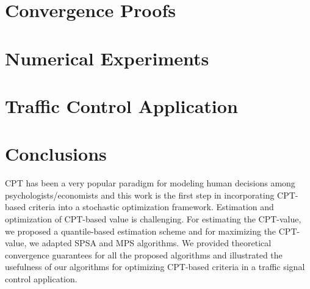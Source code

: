 \documentclass[twocolumn]{IEEEtran}
\begin{document}
\section{Convergence Proofs}
\label{sec:convergence}

\section{Numerical Experiments}
\label{sec:expts}


\section{Traffic Control Application}
\label{sec:expts}





\section{Conclusions}
\label{sec:conclusions}
CPT has been a very popular paradigm for modeling human decisions among psychologists/economists and this work is the first step in incorporating CPT-based criteria into a stochastic optimization framework. Estimation and optimization of CPT-based value is challenging. 
For estimating the CPT-value, we proposed a quantile-based estimation scheme and for maximizing the CPT-value, we adapted SPSA \cite{spall} and MPS \cite{chang2013simulation} algorithms. 
We provided theoretical convergence guarantees for all the proposed algorithms and illustrated the usefulness of our algorithms for optimizing CPT-based criteria in a traffic signal control application.



%





%
\end{document}
